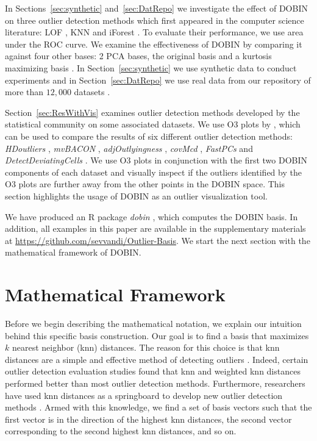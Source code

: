 \documentclass[letter,12pt]{article}
\begin{document}
In Sections~\ref{sec:synthetic} and~\ref{sec:DatRepo} we investigate the effect of DOBIN on three outlier detection methods which first appeared in the computer science literature: LOF \citep{breunig2000lof}, KNN \citep{ramaswamy2000efficient} and iForest \citep{liu2008isolation}. To evaluate their performance, we use area under the ROC curve. We examine the effectiveness of DOBIN by comparing it against {\color{blue} four other bases: 2 PCA bases,  the original basis and a kurtosis maximizing basis \citep{tyler2009invariant}}. In Section~\ref{sec:synthetic} we use synthetic data to conduct experiments and in Section~\ref{sec:DatRepo} we use real data from our repository of more than $12,000$ datasets \citep{datasets}.

Section~\ref{sec:ResWithVis} examines outlier detection methods developed by the statistical community on some associated datasets. We use O3 plots by \cite{unwin2019multivariate}, which can be used to compare the results of six different outlier detection methods: \textit{HDoutliers} \citep{wilkinson2017visualizing}, \textit{mvBACON} \citep{billor2000bacon}, \textit{adjOutlyingness} \citep{brys2005robustification}, \textit{covMcd} \citep{rousseeuw1999fast} , \textit{FastPCs} \citep{vakili2014finding} and \textit{DetectDeviatingCells} \citep{rousseeuw2018detecting}. We use O3 plots in conjunction with the first two DOBIN components of each dataset and visually inspect if the outliers identified by the O3 plots are further away from the other points in the DOBIN space. This section highlights the usage of DOBIN as an outlier visualization tool.

We have produced an R package \textit{dobin} \citep{dobin}, which computes the DOBIN basis. In addition, all examples in this paper are available in the supplementary materials at \url{https://github.com/sevvandi/Outlier-Basis}. We start the next section with the mathematical framework of DOBIN. %

\section{Mathematical Framework}\label{sec:MathFrame}
{\color{blue} Before we begin describing the mathematical notation, we explain our intuition behind this specific basis construction. Our goal is to find a basis that maximizes $k$ nearest neighbor (knn) distances. The reason for this choice is that knn distances are a simple and  effective method of detecting outliers \citep{ramaswamy2000efficient}. Indeed, certain outlier detection evaluation studies  \citep{campos2016evaluation, kandanaarachchi2018normalization, goldstein2016comparative} found that knn and weighted knn distances performed better than most outlier detection methods. Furthermore, researchers have used knn distances as a springboard to develop new outlier detection methods \citep{wilkinson2017visualizing}. Armed with this knowledge, we find a set of basis vectors such that the first vector is in the direction of the highest knn distances, the second vector corresponding to the second highest knn distances, and so on.   
 }
\end{document}

